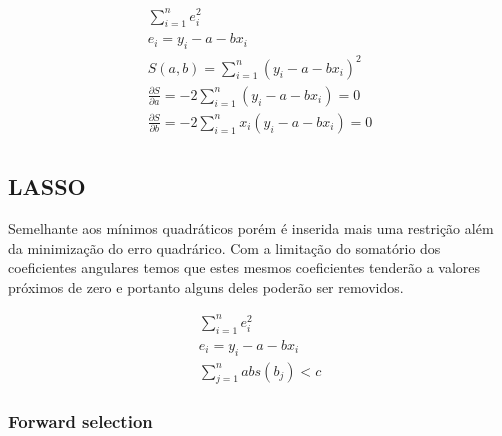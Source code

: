 \documentclass{beamer}
\begin{document}
\begin{frame}
	\begin{align}
	\sum_{i=1}^n e_i^2
	\\
	e_i = y_i - a - b x_i
	\\
	S(a,b) = \sum_{i=1}^n \left( y_i - a - b x_i \right) ^2
	\\
	\frac{\partial S}{\partial a}  = -2 \sum_{i=1}^n ( y_i - a - b x_i ) = 0 
	\\
	\frac{\partial S}{\partial b}  = -2 \sum_{i=1}^n x_i  ( y_i - a - b x_i  ) = 0 \\
	\end{align}
	
	\begin{figure}
	  \centering
	  \qquad
	\end{figure}
\end{frame}  


\subsection{LASSO}

\begin{frame}
Semelhante aos mínimos quadráticos porém é inserida mais uma restrição além da
minimização do erro quadrárico.
Com a limitação do somatório dos coeficientes angulares temos que estes mesmos
coeficientes tenderão a valores próximos de zero e portanto alguns deles poderão
ser removidos.

\begin{align}
	\sum_{i=1}^n e_i^2
	\\
	e_i = y_i - a - b x_i
	\\
	\sum_{j=1}^n abs(b_j) < c
\end{align}
\end{frame}


\subsubsection{Forward selection}
\end{document}
